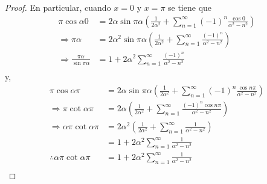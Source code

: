 \documentclass[12pt]{report}
\theoremstyle{largebreak}
\begin{document}
\begin{proof}
        En particular, cuando $x=0$ y $x=\pi$ se tiene que
        \begin{equation*}
            \begin{split}
                \pi\cos \alpha 0&=2\alpha\sin\pi\alpha\left(\frac{1}{2\alpha^2}+\sum_{n=1}^{\infty}(-1)^n\frac{\cos 0}{\alpha^2-n^2}\right)\\
                \Rightarrow \pi\alpha&=2\alpha^2\sin\pi\alpha\left(\frac{1}{2\alpha^2}+\sum_{n=1}^{\infty}\frac{(-1)^n}{\alpha^2-n^2}\right)\\
                \Rightarrow \frac{\pi\alpha}{\sin\pi\alpha}&=1+2\alpha^2\sum_{n=1}^{\infty}\frac{(-1)^n}{\alpha^2-n^2}\\
            \end{split}
        \end{equation*}
        y,
        \begin{equation*}
            \begin{split}
                \pi\cos \alpha\pi&=2\alpha\sin\pi\alpha\left(\frac{1}{2\alpha^2}+\sum_{n=1}^{\infty}(-1)^n\frac{\cos n\pi}{\alpha^2-n^2}\right)\\
                \Rightarrow \pi\cot\alpha\pi&=2\alpha\left(\frac{1}{2\alpha^2}+\sum_{n=1}^{\infty}\frac{(-1)^n\cos n\pi}{\alpha^2-n^2}\right)\\
                \Rightarrow \alpha\pi\cot\alpha\pi&=2\alpha^2\left(\frac{1}{2\alpha^2}+\sum_{n=1}^{\infty}\frac{1}{\alpha^2-n^2}\right)\\
                &=1+2\alpha^2\sum_{n=1}^{\infty}\frac{1}{\alpha^2-n^2}\\
                \therefore\alpha\pi\cot\alpha\pi&=1+2\alpha^2\sum_{n=1}^{\infty}\frac{1}{\alpha^2-n^2}\\
            \end{split}
        \end{equation*}


\end{proof}
\end{document}

